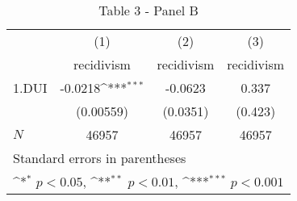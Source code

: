 \documentclass{book}
\begin{document}
\begin{table}[htbp]\centering
\def\sym#1{\ifmmode^{#1}\else\(^{#1}\)\fi}
\caption{Table 3 - Panel B}
\begin{tabular}{l*{3}{c}}
\hline\hline
            &\multicolumn{1}{c}{(1)}&\multicolumn{1}{c}{(2)}&\multicolumn{1}{c}{(3)}\\
            &\multicolumn{1}{c}{recidivism}&\multicolumn{1}{c}{recidivism}&\multicolumn{1}{c}{recidivism}\\
\hline
1.DUI       &     -0.0218\sym{***}&     -0.0623         &       0.337         \\
            &   (0.00559)         &    (0.0351)         &     (0.423)         \\
\hline
\(N\)       &       46957         &       46957         &       46957         \\
\hline\hline
\multicolumn{4}{l}{\footnotesize Standard errors in parentheses}\\
\multicolumn{4}{l}{\footnotesize \sym{*} \(p<0.05\), \sym{**} \(p<0.01\), \sym{***} \(p<0.001\)}\\
\end{tabular}
\end{table}
\end{document}
